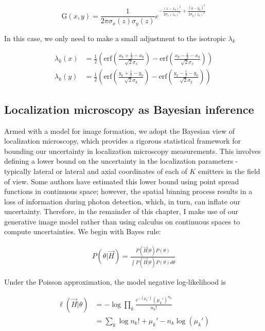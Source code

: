 \documentclass{ucetd}
\begin{document}
\begin{equation}
\mathrm{G}(x,y) = \frac{1}{2\pi\sigma_{x}(z)\sigma_{y}(z)}e^{-\frac{(x-x_{0})^{2}}{2\sigma_{x}(z_{0})^{2}}+\frac{(y-y_{0})^{2}}{2\sigma_{y}(z_{0})^{2}}}
\end{equation}


In this case, we only need to make a small adjustment to the isotropic $\lambda_{k}$

\begin{align*}
\lambda_{k}(x) &= \frac{1}{2}\left(\mathrm{erf}\left(\frac{x_{k}+\frac{1}{2}-x_{0}}{\sqrt{2}\sigma_{x}}\right) -\mathrm{erf}\left(\frac{x_{k}-\frac{1}{2}-x_{0}}{\sqrt{2}\sigma_{x}}\right)\right)\\
\lambda_{k}(y) &= \frac{1}{2}\left(\mathrm{erf}\left(\frac{y_{k}+\frac{1}{2}-y_{0}}{\sqrt{2}\sigma_{y}}\right) -\mathrm{erf}\left(\frac{y_{k}-\frac{1}{2}-y_{0}}{\sqrt{2}\sigma_{y}}\right)\right)
\end{align*}

\subsection{Localization microscopy as Bayesian inference}

Armed with a model for image formation, we adopt the Bayesian view of localization microscopy, which provides a rigorous statistical framework for bounding our uncertainty in localization microscopy measurements. This involves defining a lower bound on the uncertainty in the localization parameters - typically lateral or lateral and axial coordinates of each of $K$ emitters in the field of view. Some authors have estimated this lower bound using point spread functions in continuous space; however, the spatial binning process results in a loss of information during photon detection, which, in turn, can inflate our uncertainty. Therefore, in the remainder of this chapter, I make use of our generative image model rather than using calculus on continuous spaces to compute uncertainties. We begin with Bayes rule:

\begin{align}
P(\theta|\vec{H}) = \frac{P(\vec{H}|\theta)P(\theta)}{\int P(\vec{H}|\theta)P(\theta) d\theta}
\end{align}

Under the Poisson approximation, the model negative log-likelihood is

\begin{align}
\ell(\vec{H}|\theta) &= -\log \prod_{k} \frac{e^{-\left(\mu_{k}'\right)}\left(\mu_{k}'\right)^{n_{k}}}{n_{k}!}\\
&= \sum_{k}  \log n_{k}! + \mu_{k}' - n_{k}\log\left(\mu_{k}'\right)
\end{align}
\end{document}

